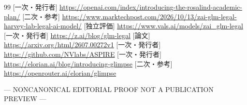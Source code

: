 \documentclass[lualatex,a4paper,10pt]{jlreq}
\begin{document}
\begin{thebibliography}{99}
 [一次・発行者] \url{https://openai.com/index/introducing-the-rosalind-academic-plan/}
 [二次・参考] \url{https://www.marktechpost.com/2026/10/13/zai-glm-legal-harvey-lab-legal-ai-model/}
 [独立評価] \url{https://www.vals.ai/models/zai_glm-legal}
 [一次・発行者] \url{https://z.ai/blog/glm-legal}
 [論文] \url{https://arxiv.org/html/2607.00272v1}
 [一次・発行者] \url{https://github.com/NVlabs/ASPIRE}
 [一次・発行者] \url{https://elorian.ai/blog/introducing-glimpse}
 [二次・参考] \url{https://openrouter.ai/elorian/glimpse}
\end{thebibliography}

\begin{center}\color{SurveyMuted}--- NONCANONICAL EDITORIAL PROOF \quad NOT A PUBLICATION PREVIEW ---\end{center}
\end{document}
